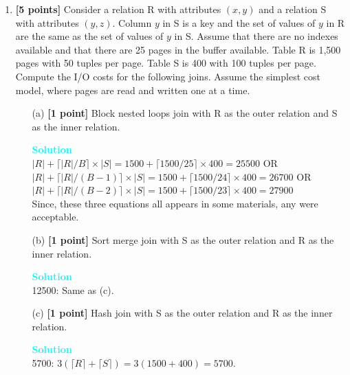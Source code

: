 \documentclass[10pt]{article}
\newenvironment{solution}
    { \begin{mdframed}[backgroundcolor=gray!10] \textcolor{cyan}{\textbf{Solution}} \\}
    {  \end{mdframed}}
\begin{document}
\begin{enumerate}
	\item \textbf{[5 points]}
	      Consider a relation R with attributes $(x,y)$ and a relation S with attributes $(y, z)$.
	      Column $y$ in S is a key and the set of values of $y$ in R are the same as the set of values of $y$ in S.
	      Assume that there are no indexes available and that there are 25 pages in the buffer available.
	      Table R is 1,500 pages with 50 tuples per page. Table S is 400 with 100 tuples per page.
	      Compute the I/O costs for the following joins. Assume the simplest cost model, where pages are read and written one at a time.
	      \begin{itemize}
		      \item[(a)] \textbf{[1 point]} Block nested loops join with R as the outer relation and S as the inner relation.
		            \begin{solution}
			            $|R| + \lceil |R| / B \rceil \times |S| = 1500 + \lceil 1500/25 \rceil \times 400 = 25500$  OR \\
			            $|R| + \lceil |R| / (B-1) \rceil \times |S| = 1500 + \lceil 1500/24 \rceil \times 400 = 26700$ OR \\
			            $|R| + \lceil |R| / (B-2) \rceil \times |S| = 1500 + \lceil 1500/23 \rceil \times 400 = 27900$\\
			            Since, these three equations all appears in some materials, any were acceptable.
		            \end{solution}
		      \item[(b)] \textbf{[1 point]} Sort merge join with S as the outer relation and R as the inner relation.
		            \begin{solution}
			            12500: Same as (c).
		            \end{solution}
		      \item[(c)] \textbf{[1 point]} Hash join with S as the outer relation and R as the inner relation.
		            \begin{solution}
			            5700: $3( \lceil R \rceil + \lceil S \rceil ) = 3(1500 + 400) = 5700$.
		            \end{solution}
	      \end{itemize}


\end{enumerate}
\end{document}
